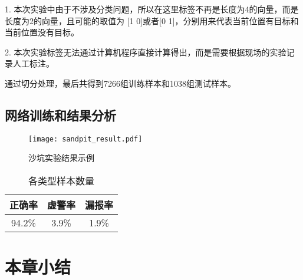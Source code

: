 1. 本次实验中由于不涉及分类问题，所以在这里标签不再是长度为4的向量，而是长度为2的向量，且可能的取值为
[1 0]或者[0 1]，分别用来代表当前位置有目标和当前位置没有目标。

2. 本次实验标签无法通过计算机程序直接计算得出，而是需要根据现场的实验记录人工标注。

通过切分处理，最后共得到7266组训练样本和1038组测试样本。
\subsection{网络训练和结果分析}
\begin{figure}[htbp]
	\texttt{[image: sandpit\_result.pdf]}
	\caption[]{沙坑实验结果示例}
	\label{sandpit_result}
\end{figure}

\begin{table}[h]
	\caption{各类型样本数量} 
	\begin{tabular}{|c|c|c|} 
		\hline  
		正确率 & 虚警率 & 漏报率\\
		\hline
		94.2\% & 3.9\% & 1.9\%\\
		\hline
	\end{tabular}
	\label{table_sanpit_acc}
\end{table}
\section{本章小结}
 